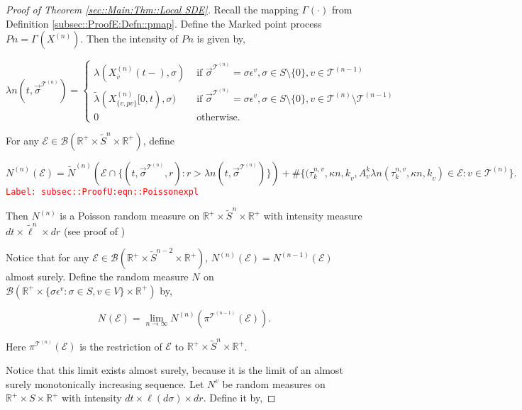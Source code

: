 \documentclass[12pt]{article}
\newcommand{\mb}{\mathbb}
\newcommand{\mc}{\mathcal}
\newcommand{\ms}{\mathscr}
\newcommand{\ra}{\rightarrow}
\newcommand{\ov}{\overline}
\newcommand{\te}{\text}
\newcommand{\ep}{\epsilon}
\newcommand{\tr}{\textcolor{red}}
\newcommand{\labe}[1]{\tr{\texttt{Label: #1}}}
\newcommand{\ind}{\hspace{24pt}}
\renewcommand{\v}{v}							%
\renewcommand{\S}{S}							%
\newcommand{\s}{\sigma}							%
\newcommand{\sv}{\vec{\s}}						%
\newcommand{\ev}{\ep}							%
\renewcommand{\t}{t}							%
\newcommand{\proj}{\pi}							%
\newcommand{\X}{X}								%
\newcommand{\vind}[1]{^{#1}}					%
\newcommand{\vsi}[1]{^{#1}}						%
\newcommand{\cind}[1]{_{#1}}					%
\newcommand{\cl}{\ov}							%
\newcommand{\tp}[1]{(#1)}						%
\newcommand{\tip}[1]{#1}						%
\newcommand{\ts}[1]{_{#1}}						%
\newcommand{\slnvind}[2]{^{#1,#2}}				%
\newcommand{\tree}{\mc{T}}						%
\newcommand{\sln}[1]{^{(#1)}}					%
\newcommand{\poiss}{N}							%
\newcommand{\Sm}{\ell}							%
\newcommand{\rate}{\lambda}						%
\renewcommand{\r}{r}							%
\newcommand{\alt}[1]{\widetilde{#1}}			%
\newcommand{\indx}[1]{_{#1}}					%
\newcommand{\rt}{\tau}							%
\renewcommand{\it}{k}							%
\newcommand{\evnt}{\mc{E}}						%
\newcommand{\rv}{A}								%
\newcommand{\pmap}{\Gamma}						%
\renewcommand{\mark}{\kappa}					%
\newcommand{\rp}{P}								%
\newcommand{\crate}{\alt{\lambda}}				%
\newcommand{\p}{p}								%
\begin{document}
\begin{proof}[Proof of Theorem \ref{sec::Main:Thm::Local SDE}]
\ind Recall the mapping \(\pmap\vind{}(\cdot)\) from Definition \ref{subsec::ProofE:Defn::pmap}. Define the Marked point process \(\rp{n} = \pmap\vind{}(\X\sln{n}\cind{}\tip{})\). Then the intensity of \(\rp{n}\) is given by,

\[\rate{n}(\t,\sv\cind{}\vsi{\tree\sln{n}}) = \begin{cases}
\rate{}(\X\sln{n}\cind{\cl{\v}}\tp{\t-},\s) &\te{ if } \sv\cind{}\vsi{\tree\sln{n}} = \s\ev\vind{\v},\s \in \S\setminus\{0\},\v\in\tree\sln{n-1}\\
\crate{}{}(\X\sln{n}\cind{\{\v,\p{\v}\}}\tip{[0,\t)},\s) &\te{ if } \sv\cind{}\vsi{\tree\sln{n}} = \s\ev\vind{\v},\s\in\S\setminus\{0\},\v\in\tree\sln{n}\setminus\tree\sln{n-1}\\
0 &\te{ otherwise.}
\end{cases}\]

For any \(\evnt \in \ms{B}(\mb{R}^+\times\alt{\S}^n\times\mb{R}^+)\), define

\begin{equation}
\poiss\sln{n}(\evnt) = \alt{\poiss}\sln{n}\left(\evnt\cap\{(\t,\sv\cind{}\vsi{\tree\sln{n}},\r):\r > \rate{n}(\t,\sv\cind{}\vsi{\tree\sln{n}})\}\right) + \#\{(\rt\slnvind{n}{\v}\indx{\it},\mark{n,\it}_\v,\rv_{\v}^{\it}\rate{n}(\rt\slnvind{n}{\v}\indx{\it},\mark{n,\it}_\v) \in \evnt: \v\in \tree\sln{n}\}.
\label{subsec::ProofU:eqn::Poissonexpl}
\end{equation}
\labe{subsec::ProofU:eqn::Poissonexpl}

Then \(\poiss\sln{n}\) is a Poisson random measure on \(\mb{R}^+\times\alt{\S}^n\times \mb{R}^+\) with intensity measure \(d\t\times \alt{\Sm}^n\times d\r\) (see proof of \cite[Theorem 14.7.1(b)]{DalVer08})

\ind Notice that for any \(\evnt \in \ms{B}(\mb{R}^+\times \alt{\S}^{n-2}\times \mb{R}^+)\), \(\poiss\sln{n}(\evnt) = \poiss\sln{n-1}(\evnt)\) almost surely. Define the random measure \(\poiss\vind{}\) on \(\ms{B}(\mb{R}^+\times \{\s\ev\vind{\v}:\s\in \S,\v \in V\}\times \mb{R}^+)\) by,

\[\poiss\vind{}(\evnt) = \lim_{n \ra\infty}\poiss\sln{n}\left(\proj\vsi{\tree\sln{n-1}}\ts{}(\evnt)\right).\]

Here \(\proj\vsi{\tree\sln{n}}\ts{}(\evnt)\) is the restriction of \(\evnt\) to \(\mb{R}^+\times \alt{\S}^n\times\mb{R}^+\). 

\ind Notice that this limit exists almost surely, because it is the limit of an almost surely monotonically increasing sequence. Let \(\poiss\vind{\v}\) be random measures on \(\mb{R}^+\times\S\times\mb{R}^+\) with intensity \(d\t\times\Sm(d\s)\times d\r\). Define it by,


\end{proof}
\end{document}
